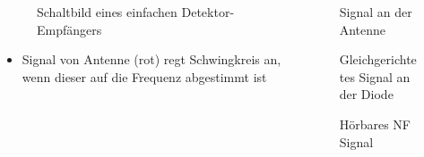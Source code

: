\begin{frame}
\begin{columns}
    \begin{column}{0.48\textwidth}
    
\begin{figure}
    \caption{\scriptsize Schaltbild eines einfachen Detektor-Empfängers}
    \label{am_detektor}
\end{figure}

\begin{itemize}
  \item Signal von Antenne (rot) regt Schwingkreis an, wenn dieser auf die Frequenz abgestimmt ist
  \end{itemize}

    \end{column}
   \begin{column}{0.48\textwidth}
       
\begin{figure}
    \caption{\scriptsize Signal an der Antenne}
    \label{am_detektor_antenne}
\end{figure}


\begin{figure}
    \caption{\scriptsize Gleichgerichtetes Signal an der Diode}
    \label{am_detektor_diode}
\end{figure}


\begin{figure}
    \caption{\scriptsize Hörbares NF Signal}
    \label{am_detektor_kopfhoerer}
\end{figure}


   \end{column}
\end{columns}

\end{frame}

